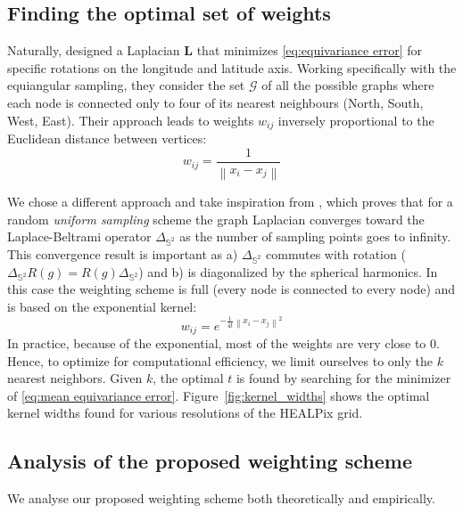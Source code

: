 \documentclass{article} %
\newcommand{\norm}[1]{\left\lVert#1\right\rVert}
\renewcommand{\b}[1]{{\bm{#1}}}  %
\newcommand{\Figref}[1]{Figure~\ref{fig:#1}}
\begin{document}
\subsection{Finding the optimal set of weights}  \label{sec:optimal}
Naturally, \citet{khasanova2017sphericalcnn} designed a Laplacian $\b{L}$ that minimizes \eqref{eq:equivariance error} for specific rotations on the longitude and latitude axis.
Working specifically with the equiangular sampling, they consider the set $\mathcal{G}$ of all the possible graphs where each node is connected only to four of its nearest neighbours (North, South, West, East).
Their approach leads to weights $w_{ij}$ inversely proportional to the Euclidean distance between vertices:
\begin{equation} \label{eqn:weights:khasanova}
	w_{ij} = \frac{1}{\norm{x_i-x_j}}
\end{equation}

We chose a different approach and take inspiration from \citet{belkin2005towards}, which proves that for a random \emph{uniform sampling} scheme the graph Laplacian converges toward the Laplace-Beltrami operator $\Delta_{\mathbb{S}^2}$ as the number of sampling points goes to infinity.
This convergence result is important as a) $\Delta_{\mathbb{S}^2}$ commutes with rotation ($\Delta_{\mathbb{S}^2}R(g) = R(g)\Delta_{\mathbb{S}^2}$) and b) is diagonalized by the spherical harmonics.
In this case the weighting scheme is full (every node is connected to every node) and is based on the exponential kernel:
\begin{equation} \label{eqn:weights:belkin}
w_{ij} = e^{-\frac{1}{4t} \norm{x_i-x_j}^2}
\end{equation}
In practice, because of the exponential, most of the weights are very close to $0$. Hence, to optimize for computational efficiency, we limit ourselves to only the $k$ nearest neighbors.
Given $k$, the optimal $t$ is found by searching for the minimizer of \eqref{eq:mean equivariance error}.
\Figref{kernel_widths} shows the optimal kernel widths found for various resolutions of the HEALPix grid.


\subsection{Analysis of the proposed weighting scheme}
We analyse our proposed weighting scheme both theoretically and empirically.
\end{document}
